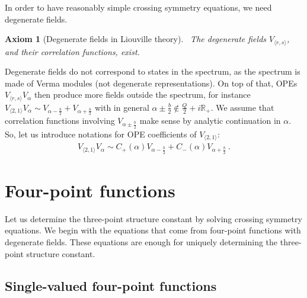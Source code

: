 \documentclass[12pt, a4paper]{article}
\theoremstyle{break}
\newtheorem{hyp}[exo]{Axiom}
\begin{document}
In order to have reasonably simple crossing symmetry equations, we need degenerate fields. 
\begin{hyp}[Degenerate fields in Liouville theory]
 ~\label{hyp:degl}
 The degenerate fields $V_{\langle r, s\rangle}$, and their correlation functions, exist. 
\end{hyp}
Degenerate fields do not correspond to states in the spectrum, as the spectrum is made of Verma modules (not degenerate representations). 
On top of that, 
OPEs $V_{\langle r, s\rangle}V_\alpha$ then produce more fields outside the spectrum, for instance 
$V_{\langle 2, 1\rangle} V_\alpha \sim V_{\alpha-\frac{b}{2}} + V_{\alpha+\frac{b}{2}}$ with in general $\alpha\pm\frac{b}{2}\notin \frac{Q}{2}+i\mathbb{R}_+$. We assume that correlation functions involving $V_{\alpha\pm\frac{b}{2}}$ make sense by analytic continuation in $\alpha$. So, let us introduce notations for OPE coefficients of $V_{\langle 2, 1\rangle}$:
\begin{align}
 V_{\langle 2, 1\rangle} V_\alpha \sim C_+(\alpha) V_{\alpha-\frac{b}{2}} + C_-(\alpha)V_{\alpha +\frac{b}{2}}\ .
\end{align}


\section{Four-point functions}\label{sec:4pt}

Let us determine the three-point structure constant by solving crossing symmetry equations. We begin with the equations that come from four-point functions with degenerate fields. These equations are enough for uniquely determining the three-point structure constant.

\subsection{Single-valued four-point functions}
\end{document}
